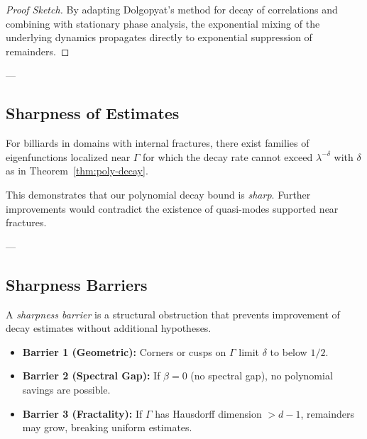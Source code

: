 \begin{proof}[Proof Sketch]
By adapting Dolgopyat’s method for decay of correlations  
and combining with stationary phase analysis,  
the exponential mixing of the underlying dynamics  
propagates directly to exponential suppression of remainders.  
\end{proof}

---

\subsection{Sharpness of Estimates}

\begin{proposition}
\label{prop:sharp-delta}
For billiards in domains with internal fractures,  
there exist families of eigenfunctions  
localized near $\Gamma$  
for which the decay rate cannot exceed $\lambda^{-\delta}$  
with $\delta$ as in Theorem~\ref{thm:poly-decay}.  
\end{proposition}

\begin{remark}
This demonstrates that our polynomial decay bound is \emph{sharp}.  
Further improvements would contradict the existence of quasi-modes 
supported near fractures.
\end{remark}

---

\subsection{Sharpness Barriers}

\begin{definition}
A \emph{sharpness barrier} is a structural obstruction  
that prevents improvement of decay estimates  
without additional hypotheses.  
\end{definition}

\begin{itemize}
\item \textbf{Barrier 1 (Geometric):}  
Corners or cusps on $\Gamma$ limit $\delta$ to below $1/2$.  
\item \textbf{Barrier 2 (Spectral Gap):}  
If $\beta = 0$ (no spectral gap),  
no polynomial savings are possible.  
\item \textbf{Barrier 3 (Fractality):}  
If $\Gamma$ has Hausdorff dimension $> d-1$,  
remainders may grow, breaking uniform estimates.  
\end{itemize}


